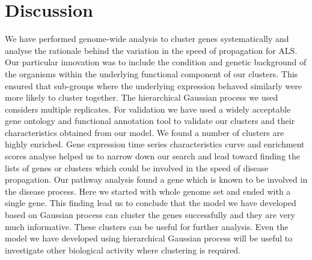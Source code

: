 \section{Discussion}
We have performed genome-wide analysis to cluster genes systematically and analyse the rationale behind the variation in the speed of propagation for ALS. Our particular innovation was to include the condition and genetic background of the organisms within the underlying functional component of our clusters. This ensured that sub-groups where the underlying expression behaved similarly were more likely to cluster together. The hierarchical Gaussian process we used considers multiple replicates. For validation we have used a widely acceptable gene ontology and functional annotation tool to validate our clusters and their characteristics obtained from our model. We found a number of clusters are highly enriched. Gene expression time series characteristics curve and enrichment scores analyse helped us to narrow down our search and lead toward finding the lists of genes or clusters which could be involved in the speed of disease propagation. Our pathway analysis found a gene which is known to be
involved in the disease process. Here we started with whole genome set and ended with a single gene. This finding lead us to conclude that the model we have developed based on Gaussian process can cluster the genes successfully and they are very much informative. These clusters can be useful for further analysis.  Even the model we have developed using hierarchical Gaussian process will be useful to investigate other biological activity where clustering is required. 
